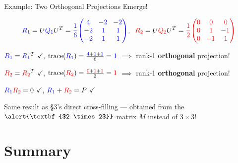 \documentclass[10pt]{beamer}
\theoremstyle{definition}
\newcommand{\x}[1]{\alert{\textbf{#1}}}
\newcommand{\rd}[1]{{\color{red}#1}}                  %
\newcommand{\bl}[1]{{\color{blue}#1}}                 %
\begin{document}
\begin{frame}{Example: Two Orthogonal Projections Emerge!}

$$\bl{R_1} = U\bl{Q_1}U^T = \bl{\frac{1}{6}\!\begin{pmatrix} 4 & \!-2 & \!-2 \\ -2 & 1 & 1 \\ -2 & 1 & 1 \end{pmatrix}}, \;\;
\rd{R_2} = U\rd{Q_2}U^T = \rd{\frac{1}{2}\!\begin{pmatrix} 0 & 0 & 0 \\ 0 & 1 & \!-1 \\ 0 & \!-1 & 1 \end{pmatrix}}$$

$\bl{R_1} = \bl{R_1}^T$ $\checkmark$, \; $\operatorname{trace}(\bl{R_1}) = \frac{\bl{4}+\bl{1}+\bl{1}}{6} = \bl{1}$ \quad $\implies$ rank-1 \x{orthogonal} projection!

$\rd{R_2} = \rd{R_2}^T$ $\checkmark$, \; $\operatorname{trace}(\rd{R_2}) = \frac{\rd{0}+\rd{1}+\rd{1}}{2} = \rd{1}$ \quad $\implies$ rank-1 \x{orthogonal} projection!

\vspace{0.3em}

$\bl{R_1}\rd{R_2} = 0$ $\checkmark$, \; $\bl{R_1} + \rd{R_2} = P$ $\checkmark$

\vspace{0.3em}

Same result as \S3's direct cross-filling --- obtained from the $\x{$2 \times 2$}$ matrix $M$ instead of $3 \times 3$!

\end{frame}


\section{Summary}
\end{document}
